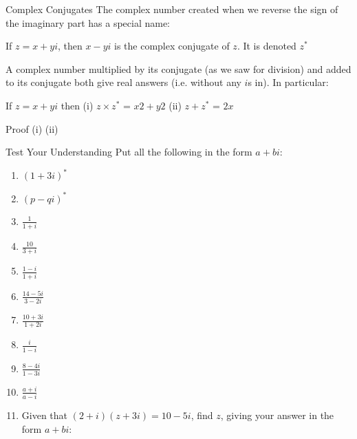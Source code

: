 \documentclass[8pt]{beamer}
\begin{document}
	\begin{frame}{Complex Conjugates}
        The complex number created when we reverse  the sign of the imaginary part has a special name:
        
        \begin{definition}
            If $z = x + yi$, then $x-yi$ is the complex conjugate of $z$. It is denoted $z^*$
        \end{definition}
        
        A complex number multiplied by its conjugate (as we saw for division) and added to its conjugate both give real answers (i.e. without any $i$s in). In particular:
        
        \begin{definition}
            If $z=x+yi$ then
            (i) $z \times z^*$  = $x2 + y2$
            (ii) $z + z^*$  = $2x$
        \end{definition}
        
        Proof
        (i) 
        (ii) 
    \end{frame}
    
	\begin{frame}[shrink=8]{Test Your Understanding}
	    Put all the following in the form $a+bi$:
	    \begin{enumerate}[label={(\alph*)}]
	        \item $(1+3i)^*$ 
	        \item $(p-qi)^*$ 
	        \item $\frac{1}{1+i}$ 
	        \item $\frac{10}{3+i}$ 
	        \item $\frac{1-i}{1+i}$ 
	        \item $\frac{14-5i}{3-2i}$ 
	        \item $\frac{10+3i}{1+2i}$ 
	        \item $\frac{i}{1-i}$ 
	        \item $\frac{8-4i}{1-3i}$ 
	        \item $\frac{a+i}{a-i}$ 
	        \item Given that $(2 + i)(z + 3i) = 10 - 5i$, find $z$, giving your answer in the form $a + bi$:
	    \end{enumerate}
    \end{frame}
    
\end{document}
